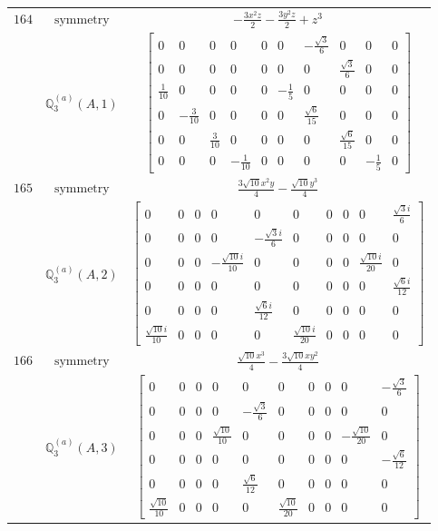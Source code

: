 \documentclass[fleqn,8pt,landscape]{jsarticle}
\begin{document}
\begin{longtable}{ccc}
$ 164 $ & $ \text{symmetry} $ & $ - \frac{3 x^{2} z}{2} - \frac{3 y^{2} z}{2} + z^{3} $ \\
$  $ & $ \mathbb{Q}_{3}^{(a)}(A,1) $ & $ \begin{bmatrix} 0 & 0 & 0 & 0 & 0 & 0 & - \frac{\sqrt{3}}{6} & 0 & 0 & 0 \\ 0 & 0 & 0 & 0 & 0 & 0 & 0 & \frac{\sqrt{3}}{6} & 0 & 0 \\ \frac{1}{10} & 0 & 0 & 0 & 0 & - \frac{1}{5} & 0 & 0 & 0 & 0 \\ 0 & - \frac{3}{10} & 0 & 0 & 0 & 0 & \frac{\sqrt{6}}{15} & 0 & 0 & 0 \\ 0 & 0 & \frac{3}{10} & 0 & 0 & 0 & 0 & \frac{\sqrt{6}}{15} & 0 & 0 \\ 0 & 0 & 0 & - \frac{1}{10} & 0 & 0 & 0 & 0 & - \frac{1}{5} & 0 \end{bmatrix} $ \\ \hline
$ 165 $ & $ \text{symmetry} $ & $ \frac{3 \sqrt{10} x^{2} y}{4} - \frac{\sqrt{10} y^{3}}{4} $ \\
$  $ & $ \mathbb{Q}_{3}^{(a)}(A,2) $ & $ \begin{bmatrix} 0 & 0 & 0 & 0 & 0 & 0 & 0 & 0 & 0 & \frac{\sqrt{3} i}{6} \\ 0 & 0 & 0 & 0 & - \frac{\sqrt{3} i}{6} & 0 & 0 & 0 & 0 & 0 \\ 0 & 0 & 0 & - \frac{\sqrt{10} i}{10} & 0 & 0 & 0 & 0 & \frac{\sqrt{10} i}{20} & 0 \\ 0 & 0 & 0 & 0 & 0 & 0 & 0 & 0 & 0 & \frac{\sqrt{6} i}{12} \\ 0 & 0 & 0 & 0 & \frac{\sqrt{6} i}{12} & 0 & 0 & 0 & 0 & 0 \\ \frac{\sqrt{10} i}{10} & 0 & 0 & 0 & 0 & \frac{\sqrt{10} i}{20} & 0 & 0 & 0 & 0 \end{bmatrix} $ \\ \hline
$ 166 $ & $ \text{symmetry} $ & $ \frac{\sqrt{10} x^{3}}{4} - \frac{3 \sqrt{10} x y^{2}}{4} $ \\
$  $ & $ \mathbb{Q}_{3}^{(a)}(A,3) $ & $ \begin{bmatrix} 0 & 0 & 0 & 0 & 0 & 0 & 0 & 0 & 0 & - \frac{\sqrt{3}}{6} \\ 0 & 0 & 0 & 0 & - \frac{\sqrt{3}}{6} & 0 & 0 & 0 & 0 & 0 \\ 0 & 0 & 0 & \frac{\sqrt{10}}{10} & 0 & 0 & 0 & 0 & - \frac{\sqrt{10}}{20} & 0 \\ 0 & 0 & 0 & 0 & 0 & 0 & 0 & 0 & 0 & - \frac{\sqrt{6}}{12} \\ 0 & 0 & 0 & 0 & \frac{\sqrt{6}}{12} & 0 & 0 & 0 & 0 & 0 \\ \frac{\sqrt{10}}{10} & 0 & 0 & 0 & 0 & \frac{\sqrt{10}}{20} & 0 & 0 & 0 & 0 \end{bmatrix} $ \\ \hline

\end{longtable}
\end{document}
